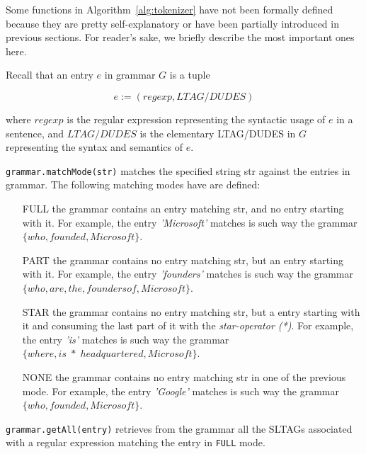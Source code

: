 Some functions in Algorithm~\ref{alg:tokenizer} have not been formally defined because they are pretty self-explanatory or have been partially introduced in previous sections.
For reader's sake, we briefly describe the most important ones here. 

Recall that an entry $e$ in grammar $G$ is a tuple

\begin{equation}
\label{eqn:grammar-entry}
e:=(regexp,LTAG/DUDES)
\end{equation}

where
$regexp$ is the regular expression representing the syntactic usage of $e$ in a sentence, and
$LTAG/DUDES$ is the elementary LTAG/DUDES in $G$ representing the syntax and semantics of $e$.

\texttt{grammar.matchMode(str)} matches the specified string str against the entries in grammar. 
%
The following matching modes have are defined:
%
\begin{itemize}
	\item[FULL] the grammar contains an entry matching str, and no entry starting with it. 
	For example, the entry \textit{'Microsoft'} matches is such way the grammar $\{who,founded,Microsoft\}$.
	
	\item[PART] the grammar contains no entry matching str, but an entry starting with it.
	For example, the entry \textit{'founders'} matches is such way the grammar $\{who,are,the,founders of,Microsoft\}$.
	
	\item[STAR] the grammar contains no entry matching str, but a entry starting with it and consuming the last part of it with the \textit{star-operator (*)}.
	For example, the entry \textit{'is'} matches is such way the grammar $\{where,is\;*\;headquartered,Microsoft\}$.

	\item[NONE] the grammar contains no entry matching str in one of the previous mode.
	For example, the entry \textit{'Google'} matches is such way the grammar $\{who,founded,Microsoft\}$.
\end{itemize}

\texttt{grammar.getAll(entry)} retrieves from the grammar all the SLTAGs associated with a regular expression matching the entry in \texttt{FULL} mode.